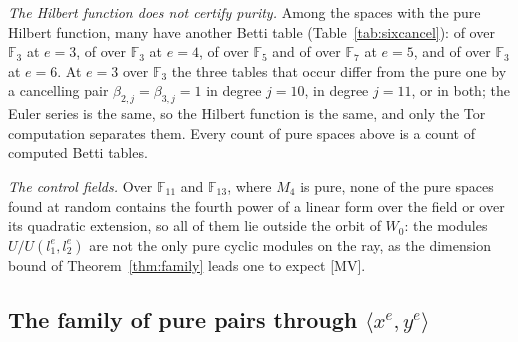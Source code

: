 \documentclass[11pt]{article}
\theoremstyle{definition}
\theoremstyle{remark}
\newcommand{\F}{\mathbb{F}}
\begin{document}
\emph{The Hilbert function does not certify purity.} Among the spaces with the pure Hilbert function, many have another Betti table (Table~\ref{tab:sixcancel}): \nsixAOneThreeNonpure{} of \nsixAOneThreePureHF{} over $\F_3$ at $e=3$, \nsixBOneThreeNonpure{} of \nsixBOneThreePureHF{} over $\F_3$ at $e=4$, \neightAFiveNonpure{} of \neightAFivePureHF{} over $\F_5$ and \neightBSevenNonpure{} of \neightBSevenPureHF{} over $\F_7$ at $e=5$, and \neightCThreeNonpure{} of \neightCThreePureHF{} over $\F_3$ at $e=6$. At $e=3$ over $\F_3$ the three tables that occur differ from the pure one by a cancelling pair $\beta_{2,j}=\beta_{3,j}=1$ in degree $j=10$, in degree $j=11$, or in both; the Euler series is the same, so the Hilbert function is the same, and only the Tor computation separates them. Every count of pure spaces above is a count of computed Betti tables.

\begin{table}[htbp]
\centering\footnotesize

\caption{Spaces with the pure Hilbert function $h_e$ and a Betti table other than $(1,2,2,1)$: for each family and field the number with the pure Hilbert function, with the pure table, with another table (a table with a cancelling pair of Betti numbers), the number of distinct such tables and their share among the spaces with the pure Hilbert function.}
\label{tab:sixcancel}
\end{table}

\emph{The control fields.} Over $\F_{11}$ and $\F_{13}$, where $M_4$ is pure, none of the \nsixControlTotal{} pure spaces found at random contains the fourth power of a linear form over the field or over its quadratic extension, so all of them lie outside the orbit of $W_0$: the modules $U/U(l_1^e,l_2^e)$ are not the only pure cyclic modules on the ray, as the dimension bound of Theorem~\ref{thm:family} leads one to expect [MV].

\subsection{The family of pure pairs through \texorpdfstring{$\langle x^e,y^e\rangle$}{the power pair}}
\label{sec:resfamily}
\end{document}
